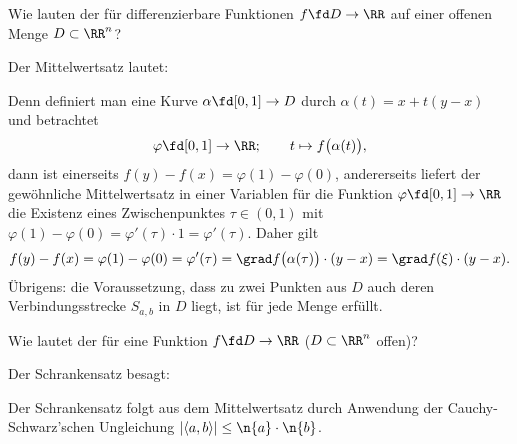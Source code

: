\begin{frage}
  \label{10_mittelwertsatz}
  Wie lauten der  für 
  differenzierbare Funktionen $f\fd D\to \RR$ auf einer 
  offenen Menge $D\subset \RR^n$?
\end{frage}  



\begin{antwort}
  Der Mittelwertsatz lautet: 

  \medskip\noindent
  Denn definiert man eine Kurve $\alpha \fd [0,1] \to D$ durch 
  $\alpha(t)=x+t(y-x)$ und betrachtet  
  \[
  \varphi\fd [0,1] \to \RR; \qquad t \mapsto f \big( \alpha(t) \big),
  \]
  dann ist einerseits $f(y)-f(x)=\varphi(1)-\varphi(0)$, andererseits liefert 
  der gewöhnliche Mittelwertsatz in einer Variablen für die 
  Funktion $\varphi \fd [0,1]\to \RR$ die Existenz eines Zwischenpunktes 
  $\tau \in (0,1)$ mit $\varphi(1)-\varphi(0) = \varphi'(\tau)\cdot 1 = 
  \varphi'(\tau)$. Daher gilt 
  \[
  f(y)-f(x) = \varphi(1)-\varphi(0)=\varphi'(\tau) = 
  \grad f\big( \alpha(\tau) \big) \cdot (y-x ) = 
  \grad f( \xi ) \cdot (y-x).
  \]
  Übrigens: die Voraussetzung, dass zu zwei Punkten aus $D$ auch deren 
  Verbindungsstrecke $S_{a,b}$ in $D$ liegt, ist für jede 
   Menge erfüllt.
  \AntEnd 
\end{antwort}



\begin{frage}
  Wie lautet der  für eine Funktion 
  $f\fd D \to \RR$ ($D\subset \RR^n$ offen)?
\end{frage}

\begin{antwort}
  Der Schrankensatz besagt: 

  \medskip\noindent
  Der Schrankensatz folgt aus dem Mittelwertsatz durch Anwendung 
  der Cauchy-Schwarz'schen Ungleichung 
  $ | \langle a,b \rangle | \le \n{a} \cdot \n{b}$.
  \AntEnd 
\end{antwort}

